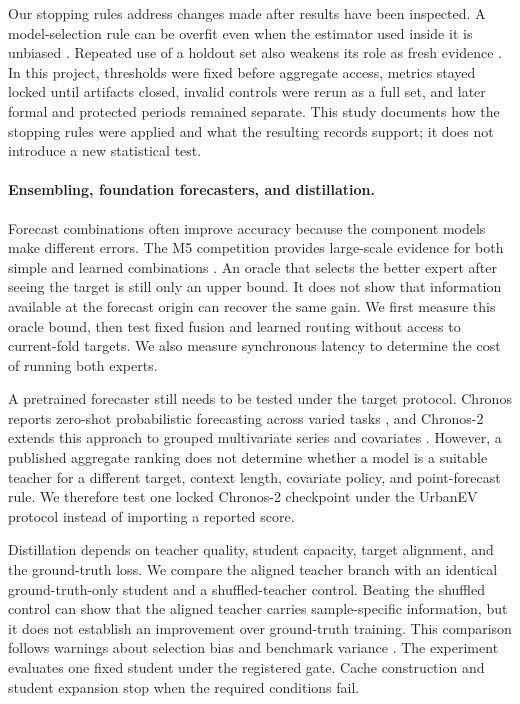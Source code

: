 Our stopping rules address changes made after results have been inspected.  A model-selection rule can be overfit even when the estimator used inside it is unbiased \cite{cawley2010selectionbias}.  Repeated use of a holdout set also weakens its role as fresh evidence \cite{dwork2015reusableholdout}.  In this project, thresholds were fixed before aggregate access, metrics stayed locked until artifacts closed, invalid controls were rerun as a full set, and later formal and protected periods remained separate.  This study documents how the stopping rules were applied and what the resulting records support; it does not introduce a new statistical test.

\paragraph{Ensembling, foundation forecasters, and distillation.}
Forecast combinations often improve accuracy because the component models make different errors.  The M5 competition provides large-scale evidence for both simple and learned combinations \cite{makridakis2022m5}.  An oracle that selects the better expert after seeing the target is still only an upper bound.  It does not show that information available at the forecast origin can recover the same gain.  We first measure this oracle bound, then test fixed fusion and learned routing without access to current-fold targets.  We also measure synchronous latency to determine the cost of running both experts.

A pretrained forecaster still needs to be tested under the target protocol.  Chronos reports zero-shot probabilistic forecasting across varied tasks \cite{ansari2024chronos}, and Chronos-2 extends this approach to grouped multivariate series and covariates \cite{ansari2025chronos2}.  However, a published aggregate ranking does not determine whether a model is a suitable teacher for a different target, context length, covariate policy, and point-forecast rule.  We therefore test one locked Chronos-2 checkpoint under the UrbanEV protocol instead of importing a reported score.

Distillation depends on teacher quality, student capacity, target alignment, and the ground-truth loss.  We compare the aligned teacher branch with an identical ground-truth-only student and a shuffled-teacher control.  Beating the shuffled control can show that the aligned teacher carries sample-specific information, but it does not establish an improvement over ground-truth training.  This comparison follows warnings about selection bias and benchmark variance \cite{cawley2010selectionbias,bouthillier2021variance}.  The experiment evaluates one fixed student under the registered gate.  Cache construction and student expansion stop when the required conditions fail.

